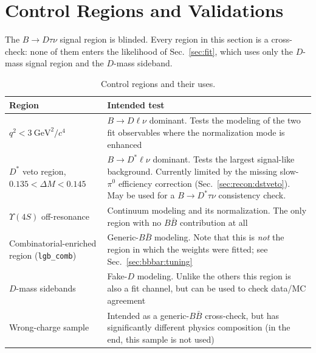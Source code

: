 \section{Control Regions and Validations}
\label{sec:validation}

The $B\to D\tau\nu$ signal region is blinded.
Every region in this section is a cross-check: none of them enters the
likelihood of Sec.~\ref{sec:fit}, which uses only the $D$-mass signal region
and the $D$-mass sideband.


\begin{table}[htbp]
  \centering
  \caption{Control regions and their uses.}
  \label{tab:control-regions}
  \small
  \begin{tabular}{p{} p{}}
    \hline
    Region & Intended test \\
    \hline
    $q^{2} < 3~\mathrm{GeV}^{2}/c^{4}$ &
      $B \to D \ell \nu$ dominant. Tests the modeling of the two fit
      observables where the normalization mode is enhanced \\
    $D^{*}$ veto region, $0.135 < \Delta M < 0.145$ &
      $B \to D^{*} \ell \nu$ dominant. Tests the largest signal-like
      background. Currently limited by the missing slow-$\pi^{0}$ efficiency
      correction (Sec.~\ref{sec:recon:dstveto}). May be used for a $B\to D^*\tau\nu$ consistency check. \\
    $\Upsilon(4S)$ off-resonance &
      Continuum modeling and its normalization. The only region with no
      $B\bar{B}$ contribution at all \\
    Combinatorial-enriched region (\texttt{lgb\_comb}) &
      Generic-$B\bar{B}$ modeling. Note that this is \emph{not} the region in
      which the weights were fitted; see
      Sec.~\ref{sec:bbbar:tuning} \\
$D$-mass sidebands &
      Fake-$D$ modeling. Unlike the others this region is also a fit
      channel, but can be used to check data/MC agreement \\      
    Wrong-charge sample &
      Intended as a generic-$B\bar{B}$ cross-check, but has significantly different physics composition (in the end, this sample is not used)\\
    
    \hline
  \end{tabular}
\end{table}





